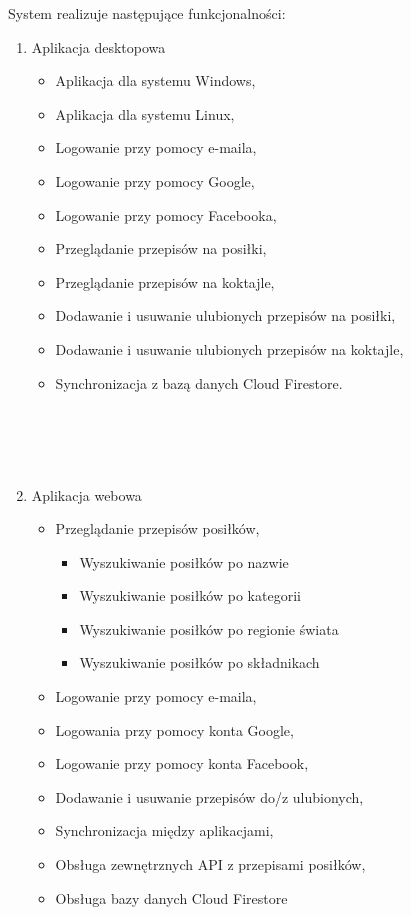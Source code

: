 \documentclass[12pt,a4paper]{article}
\begin{document}
		\indent System realizuje następujące funkcjonalności:
		\begin{enumerate}
			\item Aplikacja desktopowa
			\begin{itemize}
				\item Aplikacja dla systemu Windows,
				\item Aplikacja dla systemu Linux,
				\item Logowanie przy pomocy e-maila,
				\item Logowanie przy pomocy Google,
				\item Logowanie przy pomocy Facebooka,
				\item Przeglądanie przepisów na posiłki,
				\item Przeglądanie przepisów na koktajle,
				\item Dodawanie i usuwanie ulubionych przepisów na posiłki,
				\item Dodawanie i usuwanie ulubionych przepisów na koktajle,
				\item Synchronizacja z bazą danych Cloud Firestore.\\\\\\\\\\
			\end{itemize}
					\item Aplikacja webowa
					
			\begin{itemize}
				\item Przeglądanie przepisów posiłków,
							\begin{itemize}
							\item Wyszukiwanie posiłków po nazwie
							\item Wyszukiwanie posiłków po kategorii
							\item Wyszukiwanie posiłków po regionie świata
							\item Wyszukiwanie posiłków po składnikach
							\end{itemize}					
				\item Logowanie przy pomocy e-maila,
				\item Logowania przy pomocy konta Google,
				\item Logowanie przy pomocy konta Facebook,
				\item Dodawanie i usuwanie przepisów do/z ulubionych,

				\item Synchronizacja między aplikacjami,
				\item Obsługa zewnętrznych API z przepisami posiłków,
				\item Obsługa bazy danych Cloud Firestore
			\end{itemize}					
							

		\end{enumerate}
		
\end{document}
